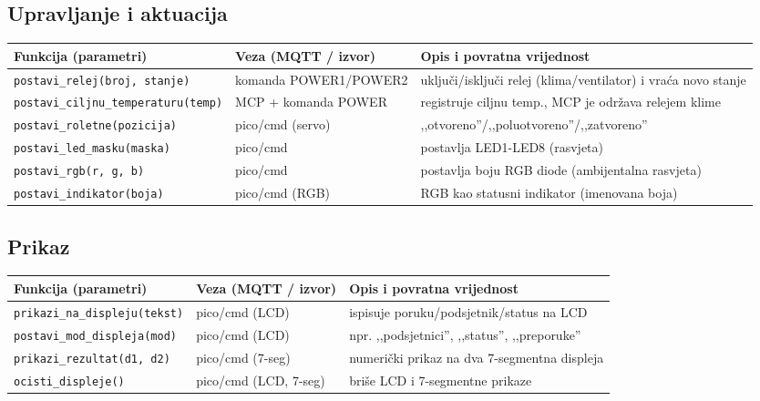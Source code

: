 \documentclass[11pt,a4paper]{article}
\begin{document}
\subsection{Upravljanje i aktuacija}
\begin{tabularx}{\textwidth}{@{}L{0.45\textwidth} L{0.26\textwidth} X@{}}
      \toprule
      \textbf{Funkcija (parametri)}               & \textbf{Veza (MQTT / izvor)} & \textbf{Opis i povratna vrijednost}                           \\
      \midrule
      \texttt{postavi\_relej(broj, stanje)}       & komanda POWER1/POWER2        & uključi/isključi relej (klima/ventilator) i vraća novo stanje \\
      \texttt{postavi\_ciljnu\_temperaturu(temp)} & MCP  + komanda POWER         & registruje ciljnu temp., MCP je održava relejem klime         \\
      \texttt{postavi\_roletne(pozicija)}         & pico/cmd (servo)             & ,,otvoreno''/,,poluotvoreno''/,,zatvoreno''                   \\
      \texttt{postavi\_led\_masku(maska)}         & pico/cmd                     & postavlja LED1-LED8 (rasvjeta)                                \\
      \texttt{postavi\_rgb(r, g, b)}              & pico/cmd                     & postavlja boju RGB diode (ambijentalna rasvjeta)              \\
      \texttt{postavi\_indikator(boja)}           & pico/cmd (RGB)               & RGB kao statusni indikator (imenovana boja)                   \\
      \bottomrule
\end{tabularx}

\subsection{Prikaz}
\begin{tabularx}{\textwidth}{@{}L{0.32\textwidth} L{0.26\textwidth} X@{}}
      \toprule
      \textbf{Funkcija (parametri)}         & \textbf{Veza (MQTT / izvor)} & \textbf{Opis i povratna vrijednost}             \\
      \midrule
      \texttt{prikazi\_na\_displeju(tekst)} & pico/cmd (LCD)               & ispisuje poruku/podsjetnik/status na LCD        \\
      \texttt{postavi\_mod\_displeja(mod)}  & pico/cmd (LCD)               & npr. ,,podsjetnici'', ,,status'', ,,preporuke'' \\
      \texttt{prikazi\_rezultat(d1, d2)}    & pico/cmd (7-seg)             & numerički prikaz na dva 7-segmentna displeja    \\
      \texttt{ocisti\_displeje()}           & pico/cmd (LCD, 7-seg)        & briše LCD i 7-segmentne prikaze                 \\
      \bottomrule
\end{tabularx}
\end{document}

